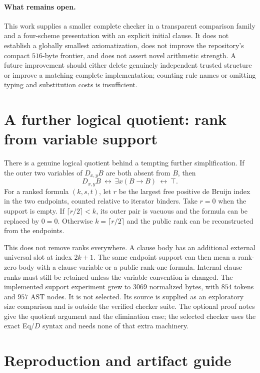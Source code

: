 \documentclass[11pt]{article}
\theoremstyle{definition}
\begin{document}
\paragraph{What remains open.}
This work supplies a smaller complete checker in a transparent comparison
family and a four-scheme presentation with an explicit initial clause.
It does not establish a globally smallest axiomatization, does not improve
the repository's compact $516$-byte frontier, and does not assert novel
arithmetic strength. A future improvement should either delete genuinely
independent trusted structure or improve a matching complete implementation;
counting rule names or omitting typing and substitution costs is insufficient.

\section{A further logical quotient: rank from variable support}

There is a genuine logical quotient behind a tempting further simplification.
If the outer two variables of $D_{x,y}B$ are both absent from $B$, then
\[
 D_{x,y}B\ \leftrightarrow\ \exists x(B\to B)\ \leftrightarrow\ \top.
\]
For a ranked formula $(k,s,t)$, let $r$ be the largest free positive
de Bruijn index in the two endpoints, counted relative to iterator binders.
Take $r=0$ when the support is empty.
If $\lceil r/2\rceil<k$, its outer pair is vacuous and the formula can
be replaced by $0=0$. Otherwise $k=\lceil r/2\rceil$ and the public rank
can be reconstructed from the endpoints.

This does not remove ranks everywhere. A clause body has an additional
external universal slot at index $2k+1$. The same endpoint support can then
mean a rank-zero body with a clause variable or a public rank-one formula.
Internal clause ranks must still be retained unless the variable convention
is changed. The implemented support experiment grew to $3069$ normalized
bytes, with $854$ tokens and $957$ AST nodes. It is not selected.
Its source is supplied as an exploratory size comparison and is outside
the verified checker suite. The optional proof notes give the quotient
argument and the elimination case; the selected checker uses the exact
Eq/$D$ syntax and needs none of that extra machinery.

\section{Reproduction and artifact guide}
\end{document}
